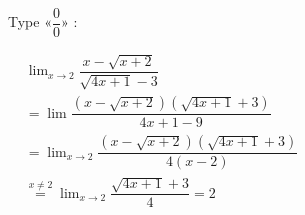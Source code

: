 {\begin{tasks}
\task Type $« \dfrac{0}{0} »$ :  

\(
\begin{aligned}
&\lim_{x \to 2} \dfrac{x - \sqrt{x + 2}}{\sqrt{4x + 1} - 3}\\
&= \lim \dfrac{(x - \sqrt{x + 2})(\sqrt{4x + 1} + 3)}{4x + 1 - 9} \\
&= \lim_{x\to 2} \dfrac{(x - \sqrt{x + 2})(\sqrt{4x + 1} + 3)}{4(x - 2)} \\
&\stackrel{x \ne 2}{=} \lim_{x\to 2} \dfrac{\sqrt{4x + 1} + 3}{4} = 2
\end{aligned}
\)
\end{tasks}
}

